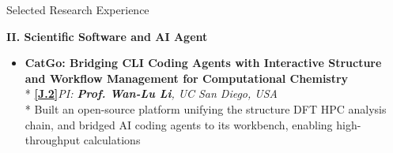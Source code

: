 \documentclass{resume} %
\begin{document}
\begin{rSection}{Selected Research Experience}
\begin{itemize}[itemsep=6pt]
\end{itemize}
\textbf{II.  Scientific Software and AI Agent}\par
\begin{itemize}[itemsep=6pt]
  \item \textbf{CatGo: Bridging CLI Coding Agents with Interactive Structure and Workflow Management for Computational Chemistry} \\* {\small\hyperlink{J.2}{\textbf{[J.2]}}}\hfill{\small\textit{PI: \textbf{Prof. Wan-Lu Li}, UC San Diego, USA}} \\* Built an open-source platform unifying the structure \textrightarrow{} DFT \textrightarrow{} HPC \textrightarrow{} analysis chain, and bridged AI coding agents to its workbench, enabling high-throughput calculations

\end{itemize}
\end{rSection}
\end{document}
